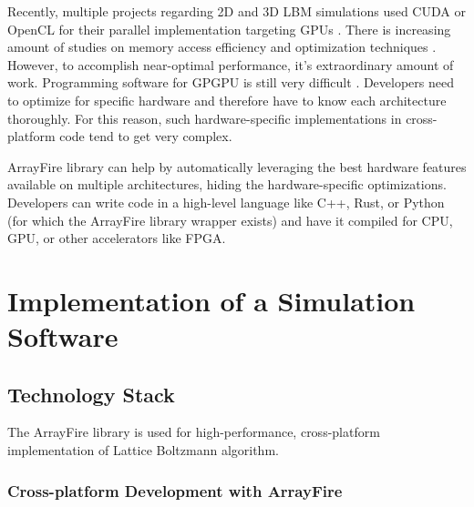 Recently, multiple projects regarding 2D and 3D LBM simulations used CUDA or OpenCL for their parallel implementation targeting GPUs \cite{delboscRealTimeSimulationIndoor, delboscOptimizedImplementationLattice2014,  januszewskiSailfishFlexibleMultiGPU2014, FULLGPUImplementation2017, kotsalosDigitalBloodMassively2019, kolihaOnlineVisualizationInteractive2015, szokePerformanceEvaluationTwoDimensional2017, harwoodLUMAManycoreFluid2018, harwoodParallelisationInteractiveLatticeBoltzmann2017}. There is increasing amount of studies on memory access efficiency and optimization techniques \cite{herschlagGPUDataAccess2018, tranPerformanceOptimization3D2017}. However, to accomplish near-optimal performance, it's extraordinary amount of work. Programming software for GPGPU is still very difficult \cite{amalcolmArrayFireGPUAcceleration2012a}. Developers need to optimize for specific hardware and therefore have to know each architecture thoroughly. For this reason, such hardware-specific implementations in cross-platform code tend to get very complex.

ArrayFire library can help by automatically leveraging the best hardware features available on multiple architectures, hiding the hardware-specific optimizations. Developers can write code in a high-level language like C++, Rust, or Python (for which the ArrayFire library wrapper exists) and have it compiled for CPU, GPU, or other accelerators like FPGA.


\section{Implementation of a Simulation Software} 

\subsection{Technology Stack} \label{sec:tech-stack}


The ArrayFire library is used for high-performance, cross-platform implementation of Lattice Boltzmann algorithm.

\subsubsection{Cross-platform Development with ArrayFire}

